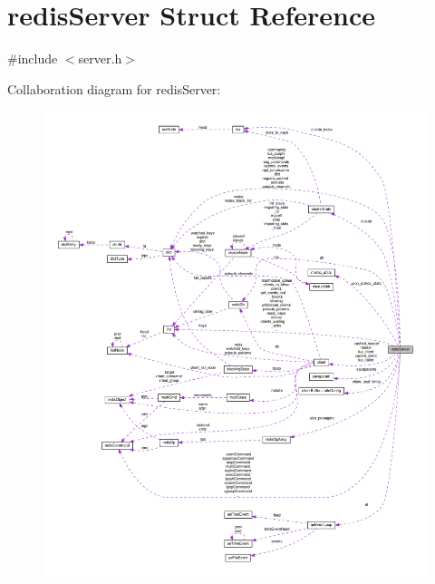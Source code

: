 \hypertarget{structredis_server}{}\section{redis\+Server Struct Reference}
\label{structredis_server}


{\ttfamily \#include $<$server.\+h$>$}



Collaboration diagram for redis\+Server\+:
\nopagebreak
\begin{figure}[H]
\begin{center}
\leavevmode
\includegraphics[width=350pt]{structredis_server__coll__graph}
\end{center}
\end{figure}
